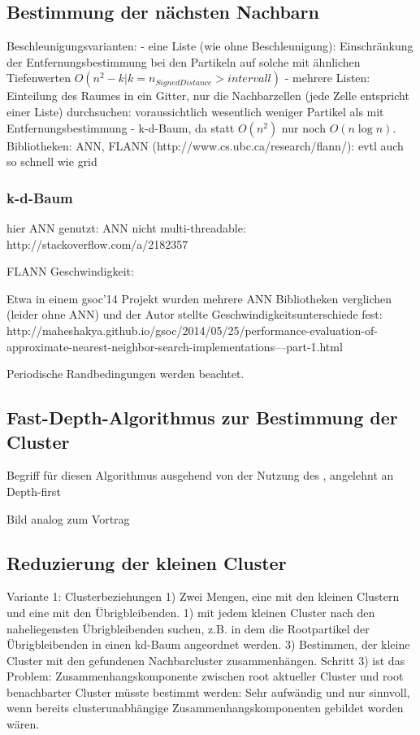 \subsection{Bestimmung der nächsten Nachbarn}
Beschleunigungsvarianten:
- eine Liste (wie ohne Beschleunigung): Einschränkung der Entfernungsbestimmung bei den Partikeln auf solche mit ähnlichen Tiefenwerten $O(n^2 - k | k = n_{SignedDistance} > intervall)$
- mehrere Listen: Einteilung des Raumes in ein Gitter, nur die Nachbarzellen (jede Zelle entspricht einer Liste) durchsuchen: voraussichtlich wesentlich weniger Partikel als mit Entfernungsbestimmung
- k-d-Baum, da statt $O(n^2)$ nur noch $O(n \log n)$. Bibliotheken: ANN, FLANN (http://www.cs.ubc.ca/research/flann/): evtl auch so schnell wie grid

\subsubsection{k-d-Baum}
hier ANN genutzt: ANN nicht multi-threadable: http://stackoverflow.com/a/2182357

FLANN Geschwindigkeit: \cite{ohara2013annAlgo}

Etwa in einem gsoc'14 Projekt wurden mehrere ANN Bibliotheken verglichen (leider ohne ANN) und der Autor stellte Geschwindigkeitsunterschiede fest: http://maheshakya.github.io/gsoc/2014/05/25/performance-evaluation-of-approximate-nearest-neighbor-search-implementations---part-1.html

Periodische Randbedingungen werden beachtet.

\subsection{Fast-Depth-Algorithmus zur Bestimmung der Cluster}
Begriff für diesen Algorithmus ausgehend von der Nutzung des , angelehnt an Depth-first

Bild analog zum Vortrag


\subsection{Reduzierung der kleinen Cluster}
Variante 1: Clusterbeziehungen
1) Zwei Mengen, eine mit den kleinen Clustern und eine mit den Übrigbleibenden.
1) mit jedem kleinen Cluster nach den naheliegensten Übrigbleibenden suchen, z.B. in dem die Rootpartikel der Übrigbleibenden in einen kd-Baum angeordnet werden.
3) Bestimmen, der kleine Cluster mit den gefundenen Nachbarcluster zusammenhängen.
Schritt 3) ist das Problem: Zusammenhangskomponente zwischen root aktueller Cluster und root benachbarter Cluster müsste bestimmt werden: Sehr aufwändig und nur sinnvoll, wenn bereits clusterunabhängige Zusammenhangskomponenten gebildet worden wären.

